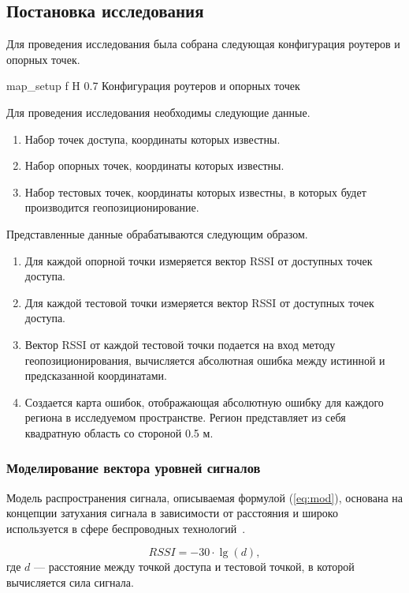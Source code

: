 \subsection{Постановка исследования}

Для проведения исследования была собрана следующая конфигурация роутеров и опорных точек.

    {map_setup}
    {f}
    {H}
    {0.7\linewidth}
    {Конфигурация роутеров и опорных точек}

Для проведения исследования необходимы следующие данные.

\begin{enumerate}
    \item Набор точек доступа, координаты которых известны.
    \item Набор опорных точек, координаты которых известны.
    \item Набор тестовых точек, координаты которых известны, в которых будет производится геопозиционирование.
\end{enumerate}

Представленные данные обрабатываются следующим образом.
\begin{enumerate}
    \item Для каждой опорной точки измеряется вектор RSSI от доступных точек доступа.
    \item Для каждой тестовой точки измеряется вектор RSSI от доступных точек доступа.
    \item Вектор RSSI от каждой тестовой точки подается на вход методу геопозиционирования, вычисляется абсолютная ошибка между истинной и предсказанной координатами.
    \item Создается карта ошибок, отображающая абсолютную ошибку для каждого региона в исследуемом пространстве. Регион представляет из себя квадратную область со стороной 0.5 м.
\end{enumerate}

\subsubsection{Моделирование вектора уровней сигналов}

Модель распространения сигнала, описываемая формулой (\ref{eq:mod}), основана на концепции затухания сигнала в зависимости от расстояния и широко используется в сфере беспроводных технологий~\cite{propagation}.

\begin{equation}
    RSSI = -30 \cdot \lg(d),
    \label{eq:mod}
\end{equation}
где $d$ --- расстояние между точкой доступа и тестовой точкой, в которой вычисляется сила сигнала.

